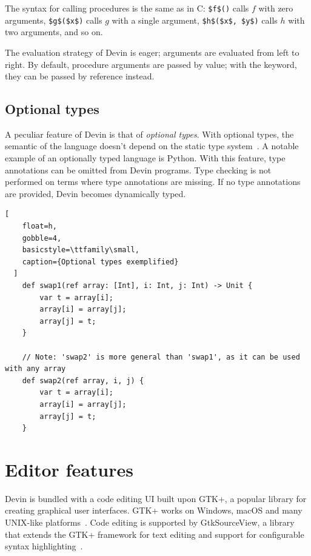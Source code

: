 \documentclass[UdineBachThesis,american,11pt]{PhdThesis}
\begin{document}
  The syntax for calling procedures is the same as in C:
  \lstinline[mathescape]@$f$()@ calls $f$ with zero arguments,
  \lstinline[mathescape]@$g$($x$)@ calls $g$ with a single argument,
  \lstinline[mathescape]@$h$($x$, $y$)@ calls $h$ with two arguments, and so on.

  The evaluation strategy of Devin is eager; arguments are evaluated from left
  to right. By default, procedure arguments are passed by value; with the
  \lstinline@ref@ keyword, they can be passed by reference instead.

  \subsection{Optional types}

  A peculiar feature of Devin is that of \emph{optional types}. With optional
  types, the semantic of the language doesn't depend on the static type
  system~\cite{pluggable-type-systems}. A notable example of an optionally typed
  language is Python. With this feature, type annotations can be omitted from
  Devin programs. Type checking is not performed on terms where type annotations
  are missing. If no type annotations are provided, Devin becomes dynamically
  typed.

  \begin{lstlisting}[
    float=h,
    gobble=4,
    basicstyle=\ttfamily\small,
    caption={Optional types exemplified}
  ]
    def swap1(ref array: [Int], i: Int, j: Int) -> Unit {
        var t = array[i];
        array[i] = array[j];
        array[j] = t;
    }

    // Note: 'swap2' is more general than 'swap1', as it can be used with any array
    def swap2(ref array, i, j) {
        var t = array[i];
        array[i] = array[j];
        array[j] = t;
    }
  \end{lstlisting}

  \section{Editor features}
  \label{section:editor-features}

  Devin is bundled with a code editing UI built upon GTK+, a popular library for
  creating graphical user interfaces. GTK+ works on Windows, macOS and many
  UNIX-like platforms~\cite{gtk+}. Code editing is supported by GtkSourceView, a
  library that extends the GTK+ framework for text editing and support for
  configurable syntax highlighting~\cite{gtksourceview}.
\end{document}
